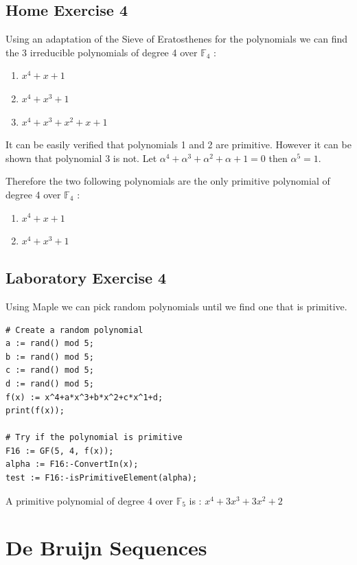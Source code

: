 \documentclass{article}
\begin{document}

\subsection{Home Exercise 4}

Using an adaptation of the Sieve of Eratosthenes for the polynomials we can find the 3 irreducible polynomials of degree 4 over $\mathbb{F}_4$ :
\begin{enumerate}
    \item $x^4+x+1$
    \item $x^4+x^3+1$
    \item $x^4+x^3+x^2+x+1$
\end{enumerate}

It can be easily verified that polynomials 1 and 2 are primitive. However it can be shown that polynomial 3 is not. Let $\alpha^4+\alpha^3+\alpha^2+\alpha+1 = 0$ then $\alpha^5=1$. \newline

Therefore the two following polynomials are the only primitive polynomial of degree 4 over $\mathbb{F}_4$ :
\begin{enumerate}
    \item $x^4+x+1$
    \item $x^4+x^3+1$
\end{enumerate}

\subsection{Laboratory Exercise 4}

Using Maple we can pick random polynomials until we find one that is primitive.
\begin{verbatim}
# Create a random polynomial
a := rand() mod 5;
b := rand() mod 5;
c := rand() mod 5;
d := rand() mod 5;
f(x) := x^4+a*x^3+b*x^2+c*x^1+d;
print(f(x));

# Try if the polynomial is primitive
F16 := GF(5, 4, f(x));
alpha := F16:-ConvertIn(x);	
test := F16:-isPrimitiveElement(alpha);
\end{verbatim}

A primitive polynomial of degree 4 over $\mathbb{F}_5$ is : $x^4+3x^3+3x^2+2$


\section{De Bruijn Sequences}
\end{document}
